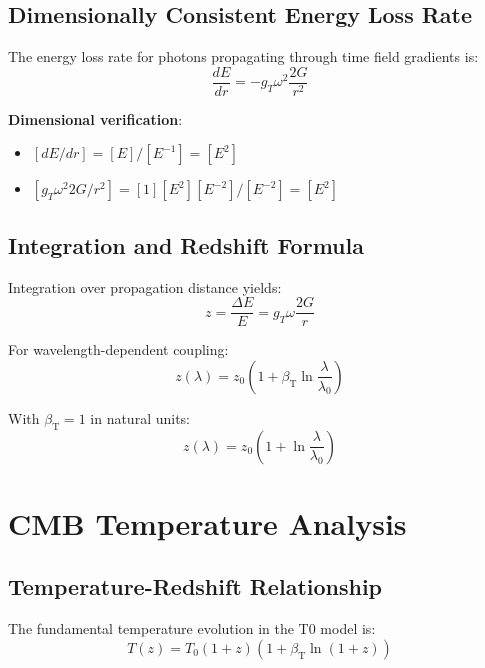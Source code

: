 \documentclass[12pt,a4paper]{article}
\newcommand{\betaT}{\beta_{\text{T}}}
\begin{document}
	\subsection{Dimensionally Consistent Energy Loss Rate}
	\label{subsec:energy_loss_rate}
	
	The energy loss rate for photons propagating through time field gradients is:
	\begin{equation}
		\frac{dE}{dr} = -g_T \omega^2 \frac{2G}{r^2}
	\end{equation}
	
	\textbf{Dimensional verification}:
	\begin{itemize}
		\item $[dE/dr] = [E]/[E^{-1}] = [E^2]$
		\item $[g_T \omega^2 2G/r^2] = [1][E^2][E^{-2}]/[E^{-2}] = [E^2]$ \checkmark
	\end{itemize}
	
	\subsection{Integration and Redshift Formula}
	\label{subsec:redshift_formula}
	
	Integration over propagation distance yields:
	\begin{equation}
		z = \frac{\Delta E}{E} = g_T \omega \frac{2G}{r}
	\end{equation}
	
	For wavelength-dependent coupling:
	\begin{equation}
		z(\lambda) = z_0\left(1 + \betaT \ln\frac{\lambda}{\lambda_0}\right)
	\end{equation}
	
	With $\betaT = 1$ in natural units:
	\begin{equation}
		\boxed{z(\lambda) = z_0\left(1 + \ln\frac{\lambda}{\lambda_0}\right)}
	\end{equation}
	
	\section{CMB Temperature Analysis}
	\label{sec:cmb_analysis}
	
	\subsection{Temperature-Redshift Relationship}
	\label{subsec:temp_redshift}
	
	The fundamental temperature evolution in the T0 model is:
	\begin{equation}
		\boxed{T(z) = T_0(1+z)\left(1 + \betaT \ln(1+z)\right)}
	\end{equation}
	
\end{document}
